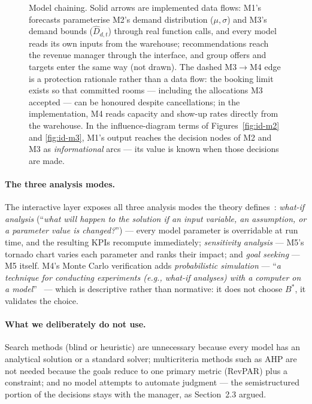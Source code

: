 \begin{figure}[H]
\caption{Model chaining. Solid arrows are implemented data flows: M1's forecasts parameterise M2's demand distribution ($\mu, \sigma$) and M3's demand bounds ($\hat{D}_{d,t}$) through real function calls, and every model reads its own inputs from the warehouse; recommendations reach the revenue manager through the interface, and group offers and targets enter the same way (not drawn). The dashed M3$\to$M4 edge is a protection rationale rather than a data flow: the booking limit exists so that committed rooms --- including the allocations M3 accepted --- can be honoured despite cancellations; in the implementation, M4 reads capacity and show-up rates directly from the warehouse. In the influence-diagram terms of Figures~\ref{fig:id-m2} and \ref{fig:id-m3}, M1's output reaches the decision nodes of M2 and M3 as \emph{informational} arcs --- its value is known when those decisions are made.}
\label{fig:chaining}
\end{figure}

\paragraph{The three analysis modes.}
The interactive layer exposes all three analysis modes the theory defines~\cite{turban2011}: \emph{what-if analysis} (``\emph{what will happen to the solution if an input variable, an assumption, or a parameter value is changed?}'') --- every model parameter is overridable at run time, and the resulting KPIs recompute immediately; \emph{sensitivity analysis} --- M5's tornado chart varies each parameter and ranks their impact; and \emph{goal seeking} --- M5 itself. M4's Monte Carlo verification adds \emph{probabilistic simulation} --- ``\emph{a technique for conducting experiments (e.g., what-if analyses) with a computer on a model}''~\cite{turban2011} --- which is descriptive rather than normative: it does not choose $B^{*}$, it validates the choice.

\paragraph{What we deliberately do not use.}
Search methods (blind or heuristic) are unnecessary because every model has an analytical solution or a standard solver; multicriteria methods such as AHP are not needed because the goals reduce to one primary metric (RevPAR) plus a constraint; and no model attempts to automate judgment --- the semistructured portion of the decisions stays with the manager, as Section~2.3 argued.
